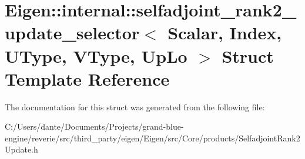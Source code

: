 \hypertarget{struct_eigen_1_1internal_1_1selfadjoint__rank2__update__selector}{}\section{Eigen\+::internal\+::selfadjoint\+\_\+rank2\+\_\+update\+\_\+selector$<$ Scalar, Index, U\+Type, V\+Type, Up\+Lo $>$ Struct Template Reference}
\label{struct_eigen_1_1internal_1_1selfadjoint__rank2__update__selector}


The documentation for this struct was generated from the following file\+:\begin{DoxyCompactItemize}
\item 
C\+:/\+Users/dante/\+Documents/\+Projects/grand-\/blue-\/engine/reverie/src/third\+\_\+party/eigen/\+Eigen/src/\+Core/products/Selfadjoint\+Rank2\+Update.\+h\end{DoxyCompactItemize}
